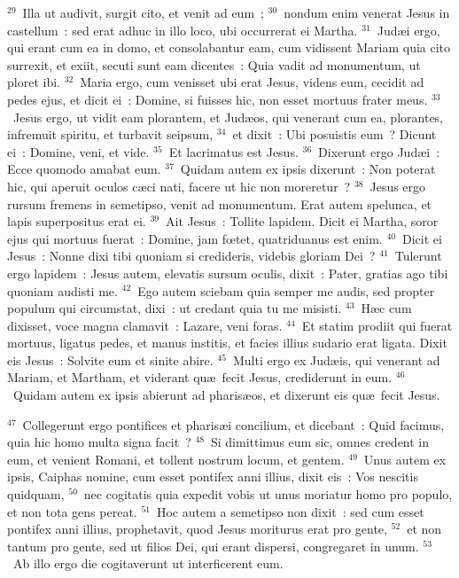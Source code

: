 ${}^{29}$~Illa ut audivit, surgit cito, et venit ad eum~;
${}^{30}$~nondum enim venerat Jesus in castellum~: sed erat adhuc in illo loco, ubi occurrerat ei Martha.
${}^{31}$~Jud\ae i ergo, qui erant cum ea in domo, et consolabantur eam, cum vidissent Mariam quia cito surrexit, et exiit, secuti sunt eam dicentes~: Quia vadit ad monumentum, ut ploret ibi.
${}^{32}$~Maria ergo, cum venisset ubi erat Jesus, videns eum, cecidit ad pedes ejus, et dicit ei~: Domine, si fuisses hic, non esset mortuus frater meus.
${}^{33}$~Jesus ergo, ut vidit eam plorantem, et Jud\ae os, qui venerant cum ea, plorantes, infremuit spiritu, et turbavit seipsum,
${}^{34}$~et dixit~: Ubi posuistis eum~? Dicunt ei~: Domine, veni, et vide.
${}^{35}$~Et lacrimatus est Jesus.
${}^{36}$~Dixerunt ergo Jud\ae i~: Ecce quomodo amabat eum.
${}^{37}$~Quidam autem ex ipsis dixerunt~: Non poterat hic, qui aperuit oculos c\ae ci nati, facere ut hic non moreretur~?
${}^{38}$~Jesus ergo rursum fremens in semetipso, venit ad monumentum. Erat autem spelunca, et lapis superpositus erat ei.
${}^{39}$~Ait Jesus~: Tollite lapidem. Dicit ei Martha, soror ejus qui mortuus fuerat~: Domine, jam fœtet, quatriduanus est enim.
${}^{40}$~Dicit ei Jesus~: Nonne dixi tibi quoniam si credideris, videbis gloriam Dei~?
${}^{41}$~Tulerunt ergo lapidem~: Jesus autem, elevatis sursum oculis, dixit~: Pater, gratias ago tibi quoniam audisti me.
${}^{42}$~Ego autem sciebam quia semper me audis, sed propter populum qui circumstat, dixi~: ut credant quia tu me misisti.
${}^{43}$~H\ae c cum dixisset, voce magna clamavit~: Lazare, veni foras.
${}^{44}$~Et statim prodiit qui fuerat mortuus, ligatus pedes, et manus institis, et facies illius sudario erat ligata. Dixit eis Jesus~: Solvite eum et sinite abire.
${}^{45}$~Multi ergo ex Jud\ae is, qui venerant ad Mariam, et Martham, et viderant qu\ae\ fecit Jesus, crediderunt in eum.
${}^{46}$~Quidam autem ex ipsis abierunt ad pharis\ae os, et dixerunt eis qu\ae\ fecit Jesus.


${}^{47}$~Collegerunt ergo pontifices et pharis\ae i concilium, et dicebant~: Quid facimus, quia hic homo multa signa facit~?
${}^{48}$~Si dimittimus eum sic, omnes credent in eum, et venient Romani, et tollent nostrum locum, et gentem.
${}^{49}$~Unus autem ex ipsis, Caiphas nomine, cum esset pontifex anni illius, dixit eis~: Vos nescitis quidquam,
${}^{50}$~nec cogitatis quia expedit vobis ut unus moriatur homo pro populo, et non tota gens pereat.
${}^{51}$~Hoc autem a semetipso non dixit~: sed cum esset pontifex anni illius, prophetavit, quod Jesus moriturus erat pro gente,
${}^{52}$~et non tantum pro gente, sed ut filios Dei, qui erant dispersi, congregaret in unum.
${}^{53}$~Ab illo ergo die cogitaverunt ut interficerent eum.


